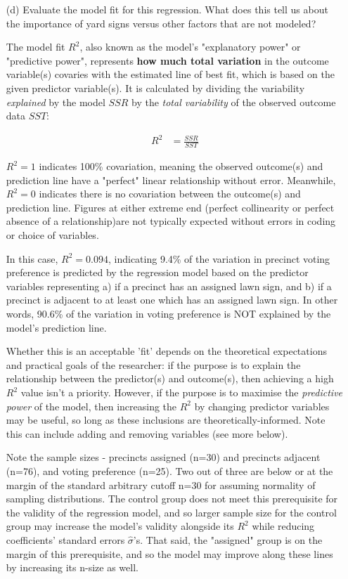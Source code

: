 \documentclass[12pt,letterpaper]{article}
\begin{document}
\begin{enumerate}
	\item [(d)] Evaluate the model fit for this regression.  What does this	tell us about the importance of yard signs versus other factors that are not modeled?
	
	The model fit $R^2$, also known as the model's "explanatory power" or "predictive power", represents \textbf{how much total variation} in the outcome variable(s) covaries with the estimated line of best fit, which is based on the given predictor variable(s). It is calculated by dividing the variability \textit{explained} by the model $SSR$ by the \textit{total variability} of the observed outcome data $SST$:
	
	\begin{align*}
		R^2 &= \frac{SSR}{SST}
	\end{align*}
	
	\noindent $R^2 = 1$ indicates 100\% covariation, meaning the observed outcome(s) and prediction line have a "perfect" linear relationship without error. Meanwhile, $R^2 = 0$ indicates there is no covariation between the outcome(s) and prediction line. Figures at either extreme end (perfect collinearity or perfect absence of a relationship)are not typically expected without errors in coding or choice of variables.
	
	\noindent In this case, $R^2 = 0.094$, indicating 9.4\% of the variation in precinct voting preference is predicted by the regression model based on the predictor variables representing a) if a precinct has an assigned lawn sign, and b) if a precinct is adjacent to at least one which has an assigned lawn sign. In other words, 90.6\% of the variation in voting preference is NOT explained by the model's prediction line.
	
	\noindent Whether this is an acceptable 'fit' depends on the theoretical expectations and practical goals of the researcher: if the purpose is to explain the relationship between the predictor(s) and outcome(s), then achieving a high $R^2$ value isn't a priority. However, if the purpose is to maximise the \textit{predictive power} of the model, then increasing the $R^2$ by changing predictor variables may be useful, so long as these inclusions are theoretically-informed. Note this can include adding and removing variables (see more below).
	
	\noindent Note the sample sizes - precincts assigned (n=30) and precincts adjacent (n=76), and voting preference (n=25). Two out of three are below or at the margin of the standard arbitrary cutoff n=30 for assuming normality of sampling distributions. The control group does not meet this prerequisite for the validity of the regression model, and so larger sample size for the control group may increase the model's validity alongside its $R^2$ while reducing coefficients' standard errors $\hat \sigma$'s. That said, the "assigned" group is on the margin of this prerequisite, and so the model may improve along these lines by increasing its n-size as well.
	 

\end{enumerate}
\end{document}
